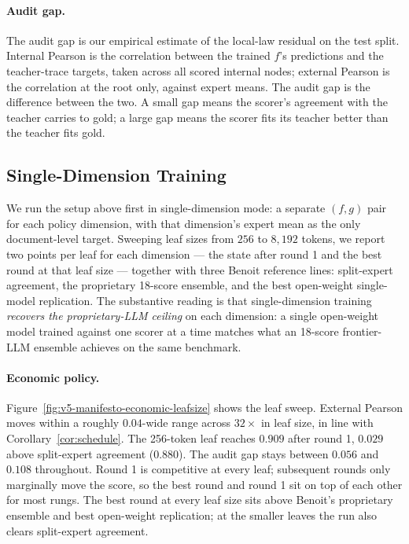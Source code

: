 \paragraph{Audit gap.}
The audit gap is our empirical estimate of the local-law residual
on the test split. Internal Pearson is the correlation between the
trained $f$'s predictions and the teacher-trace targets, taken
across all scored internal nodes; external Pearson is the
correlation at the root only, against expert means. The audit gap
is the difference between the two. A small gap means the scorer's
agreement with the teacher carries to gold; a large gap means the
scorer fits its teacher better than the teacher fits gold.


\subsection{Single-Dimension Training}\label{sec:min-manifesto-singledim}

We run the setup above first in single-dimension mode: a separate
$(f, g)$ pair for each policy dimension, with that dimension's
expert mean as the only document-level target. Sweeping leaf sizes
from $256$ to $8{,}192$ tokens, we report two points per leaf for
each dimension — the state after round 1 and the best round at
that leaf size — together with three Benoit reference lines:
split-expert agreement, the proprietary 18-score ensemble, and
the best open-weight single-model replication. The substantive reading is that single-dimension
training \emph{recovers the proprietary-LLM ceiling} on each
dimension: a single open-weight model trained against one scorer
at a time matches what an 18-score frontier-LLM ensemble achieves
on the same benchmark.

\paragraph{Economic policy.}
Figure~\ref{fig:v5-manifesto-economic-leafsize} shows the leaf
sweep. External Pearson moves within a roughly $0.04$-wide range
across $32\times$ in leaf size, in line with
Corollary~\ref{cor:schedule}. The 256-token leaf reaches $0.909$
after round 1, $0.029$ above split-expert agreement ($0.880$).
The audit gap stays between $0.056$ and $0.108$ throughout. Round
1 is competitive at every leaf; subsequent rounds only marginally
move the score, so the best round and round 1 sit on top of each
other for most rungs. The best round at every leaf size sits above
Benoit's proprietary ensemble and best open-weight replication; at
the smaller leaves the run also clears split-expert agreement.

